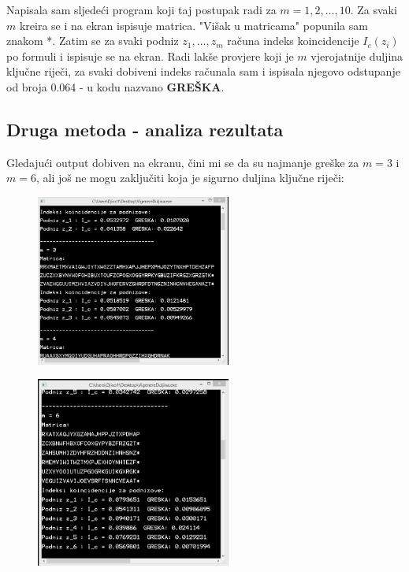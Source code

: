 \documentclass[a4paper,12pt,oneside]{article}
\begin{document}
Napisala sam sljedeći program koji taj postupak radi za $m = 1, 2, \dots, 10$. Za svaki $m$ kreira se i na ekran ispisuje matrica. "Višak u matricama" popunila sam znakom *. Zatim se za svaki podniz $z_1, \dots, z_m$ računa indeks koincidencije $I_c(z_i)$ po formuli i ispisuje se na ekran. Radi lakše provjere koji je $m$ vjerojatnije duljina ključne riječi, za svaki dobiveni indeks računala sam i ispisala njegovo odstupanje od broja 0.064 - u kodu nazvano \textbf{GREŠKA}.



\subsection*{Druga metoda - analiza rezultata}
Gledajući output dobiven na ekranu, čini mi se da su najmanje greške za $m = 3$ i $m = 6$, ali još ne mogu zaključiti koja je sigurno duljina ključne riječi:

\begin{figure}[h!] %
	\centering
		\includegraphics[width=0.57\textwidth]{output1.png}  
\end{figure}

\newpage

\begin{figure}[h!] %
	\centering
	\includegraphics[width=0.57\textwidth]{output2.png} 
\end{figure}
\end{document}
